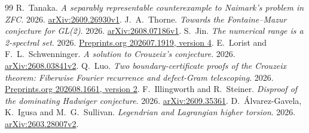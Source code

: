 \documentclass[11pt]{article}
\begin{document}
\begin{thebibliography}{99}
 R.~Tanaka. \emph{A separably representable counterexample to Naimark's problem in ZFC}. 2026. \href{https://arxiv.org/abs/2609.26930v1}{arXiv:2609.26930v1}.
 J.~A.~Thorne. \emph{Towards the Fontaine--Mazur conjecture for GL(2)}. 2026. \href{https://arxiv.org/abs/2608.07186v1}{arXiv:2608.07186v1}.
 S.~Jin. \emph{The numerical range is a 2-spectral set}. 2026. \href{https://www.preprints.org/manuscript/202607.1919/v4}{Preprints.org 202607.1919, version 4}.
 E.~Lorist and F.~L.~Schwenninger. \emph{A solution to Crouzeix's conjecture}. 2026. \href{https://arxiv.org/abs/2608.03841v2}{arXiv:2608.03841v2}.
 Q.~Luo. \emph{Two boundary-certificate proofs of the Crouzeix theorem: Fiberwise Fourier recurrence and defect-Gram telescoping}. 2026. \href{https://www.preprints.org/manuscript/202608.1661/v2}{Preprints.org 202608.1661, version 2}.
 F.~Illingworth and R.~Steiner. \emph{Disproof of the dominating Hadwiger conjecture}. 2026. \href{https://arxiv.org/abs/2609.35361}{arXiv:2609.35361}.
 D.~Álvarez-Gavela, K.~Igusa and M.~G.~Sullivan. \emph{Legendrian and Lagrangian higher torsion}. 2026. \href{https://arxiv.org/abs/2603.28007v2}{arXiv:2603.28007v2}.
\end{thebibliography}
\end{document}
